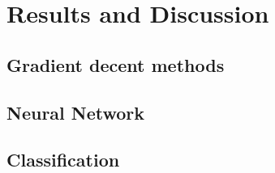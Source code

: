 \section{Results and Discussion}

\subsection{Gradient decent methods}

\subsection{Neural Network}

\subsection{Classification}

